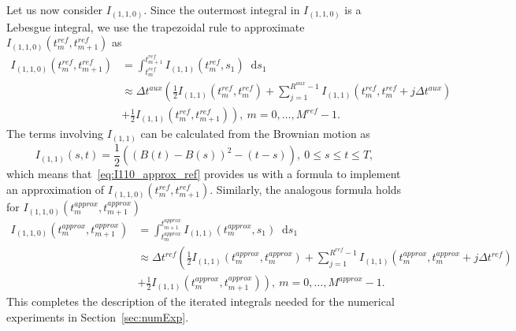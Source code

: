 \documentclass[11pt]{amsart}
\newcommand*\diff{\mathop{}\!\mathrm{d}}
\begin{document}
{Let us now consider $I_{(1,1,0)}$. Since the outermost integral in $I_{(1,1,0)}$ is a Lebesgue integral, we use the trapezoidal rule to approximate $I_{(1,1,0)}(t_{m}^{ref},t_{m+1}^{ref})$ as
\begin{equation}\label{eq:I110_approx_ref}
  \begin{split}
    I_{(1,1,0)}(t_{m}^{ref},t_{m+1}^{ref}) &= \int_{t_{m}^{ref}}^{t_{m+1}^{ref}} I_{(1,1)}(t_{m}^{ref},s_{1}) \diff s_{1} \\ &\approx \Delta t^{aux} \left( \frac{1}{2} I_{(1,1)}(t_{m}^{ref},t_{m}^{ref}) + \sum_{j=1}^{R^{aux}-1} I_{(1,1)}(t_{m}^{ref},t_{m}^{ref} + j \Delta t^{aux}) \right. \\  & \left.+ \frac{1}{2} I_{(1,1)}(t_{m}^{ref},t_{m+1}^{ref}) \right),\ m=0,\ldots,M^{ref}-1.
  \end{split}
\end{equation}
The terms involving $I_{(1,1)}$ can be calculated from the Brownian motion as
\begin{equation*}
I_{(1,1)}(s,t) = \frac{1}{2}\left( (B(t)-B(s))^2 - (t-s) \right),\ 0 \leq s \leq t \leq T,
\end{equation*}
which means that~\eqref{eq:I110_approx_ref} provides us with a formula to implement an approximation of $I_{(1,1,0)}(t_{m}^{ref},t_{m+1}^{ref})$. Similarly, the analogous formula holds for $I_{(1,1,0)}(t_{m}^{approx},t_{m+1}^{approx})$
\begin{equation*}
  \begin{split}
    I_{(1,1,0)}(t_{m}^{approx},t_{m+1}^{approx}) &= \int_{t_{m}^{approx}}^{t_{m+1}^{approx}} I_{(1,1)}(t_{m}^{approx},s_{1}) \diff s_{1} \\ &\approx \Delta t^{ref} \left( \frac{1}{2} I_{(1,1)}(t_{m}^{approx},t_{m}^{approx}) + \sum_{j=1}^{R^{ref}-1} I_{(1,1)}(t_{m}^{approx},t_{m}^{approx} + j \Delta t^{ref}) \right. \\  & \left.+ \frac{1}{2} I_{(1,1)}(t_{m}^{approx},t_{m+1}^{approx}) \right),\ m=0,\ldots,M^{approx}-1.
  \end{split}
\end{equation*}
This completes the description of the iterated integrals needed for the numerical experiments in Section~\ref{sec:numExp}.

}
\end{document}
